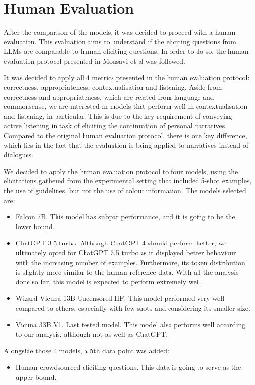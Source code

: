 
\section{Human Evaluation}
After the comparison of the models, it was decided to proceed with a human evaluation. This evaluation aims to understand if the eliciting questions from LLMs are comparable to human eliciting questions. In order to do so, the human evaluation protocol presented in Mousavi et al \cite{mousavi-etal-2022-evaluation} was followed. 

It was decided to apply all 4 metrics presented in the human evaluation protocol: correctness, appropriateness, contextualisation and listening. Aside from correctness and appropriateness, which are related from language and commonsense, we are interested in models that perform well in contextualisation and listening, in particular. This is due to the key requirement of conveying active listening in task of eliciting the continuation of personal narratives. Compared to the original human evaluation protocol, there is one key difference, which lies in the fact that the evaluation is being applied to narratives instead of dialogues. 

We decided to apply the human evaluation protocol to four models, using the elicitations gathered from the experimental setting that included 5-shot examples, the use of guidelines, but not the use of colour information. The models selected are:
\begin{itemize}
\item Falcon 7B. This model has subpar performance, and it is going to be the lower bound.
    \item ChatGPT 3.5 turbo. Although ChatGPT 4 should perform better, we ultimately opted for ChatGPT 3.5 turbo as it displayed better behaviour with the increasing number of examples. Furthermore, its token distribution is slightly more similar to the human reference data. With all the analysis done so far, this model is expected to perform extremely well.
    \item Wizard Vicuna 13B Uncensored HF. This model performed very well compared to others, especially with few shots and considering its smaller size.
    \item Vicuna 33B V1. Last tested model. This model also performs well according to our analysis, although not as well as ChatGPT.
\end{itemize}
Alongside those 4 models, a 5th data point was added:
\begin{itemize}
    \item Human crowdsourced eliciting questions. This data is going to serve as the upper bound.
\end{itemize}


